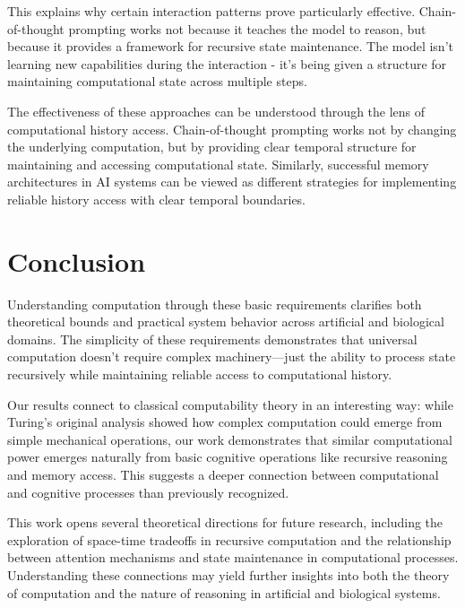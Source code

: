 \documentclass[12pt]{article}
\begin{document}
This explains why certain interaction patterns prove particularly effective. Chain-of-thought prompting works not because it teaches the model to reason, but because it provides a framework for recursive state maintenance. The model isn't learning new capabilities during the interaction - it's being given a structure for maintaining computational state across multiple steps.

The effectiveness of these approaches can be understood through the lens of computational history access. Chain-of-thought prompting works not by changing the underlying computation, but by providing clear temporal structure for maintaining and accessing computational state. Similarly, successful memory architectures in AI systems can be viewed as different strategies for implementing reliable history access with clear temporal boundaries.

\section{Conclusion}

Understanding computation through these basic requirements clarifies both theoretical bounds and practical system behavior across artificial and biological domains. The simplicity of these requirements demonstrates that universal computation doesn't require complex machinery---just the ability to process state recursively while maintaining reliable access to computational history.

Our results connect to classical computability theory in an interesting way: while Turing's original analysis showed how complex computation could emerge from simple mechanical operations, our work demonstrates that similar computational power emerges naturally from basic cognitive operations like recursive reasoning and memory access. This suggests a deeper connection between computational and cognitive processes than previously recognized.

This work opens several theoretical directions for future research, including the exploration of space-time tradeoffs in recursive computation and the relationship between attention mechanisms and state maintenance in computational processes. Understanding these connections may yield further insights into both the theory of computation and the nature of reasoning in artificial and biological systems.



\end{document}
